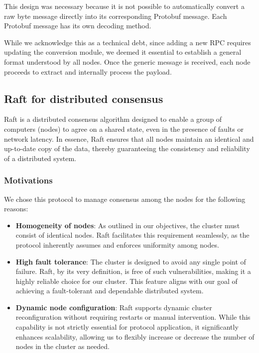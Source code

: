 \begin{itemize}
    This design was necessary because it is not possible to automatically convert a raw 
    byte message directly into its corresponding Protobuf message. Each Protobuf message 
    has its own decoding method.

    While we acknowledge this as a technical debt, since adding a new RPC requires updating 
    the conversion module, we deemed it essential to establish a general format understood 
    by all nodes. Once the generic message is received, each node proceeds to extract and 
    internally process the payload.
\end{itemize}

\subsection{Raft for distributed consensus}
Raft is a distributed consensus algorithm designed to enable a group of computers (nodes) 
to agree on a shared state, even in the presence of faults or network latency. In essence, 
Raft ensures that all nodes maintain an identical and up-to-date copy of the data, thereby 
guaranteeing the consistency and reliability of a distributed system.

\subsubsection{Motivations}
We chose this protocol to manage consensus among the nodes for the following reasons:
\begin{itemize}
	\item \textbf{Homogeneity of nodes}:
    As outlined in our objectives, the cluster must consist of identical nodes. Raft 
    facilitates this requirement seamlessly, as the protocol inherently assumes and 
    enforces uniformity among nodes.
	\item \textbf{High fault tolerance}:
    The cluster is designed to avoid any single point of failure. Raft, by its 
    very definition, is free of such vulnerabilities, making it a highly reliable choice 
    for our cluster. This feature aligns with our goal of achieving a fault-tolerant and 
    dependable distributed system.
	\item  \textbf{Dynamic node configuration}:
    Raft supports dynamic cluster reconfiguration without requiring restarts or manual 
    intervention. While this capability is not strictly essential for protocol application, 
    it significantly enhances scalability, allowing us to flexibly increase or 
    decrease the number of nodes in the cluster as needed.
\end{itemize}

